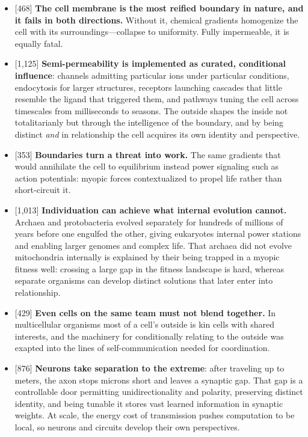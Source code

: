 \documentclass[11pt]{article}
\newcommand{\ct}[1]{{\footnotesize\color{black!55}[#1]}\hspace{1pt}}
\begin{document}
\begin{itemize}
  \item \ct{468} \textbf{The cell membrane is the most reified boundary in nature, and it fails in both directions.} Without it, chemical gradients homogenize the cell with its surroundings---collapse to uniformity. Fully impermeable, it is equally fatal.
  \item \ct{1,125} \textbf{Semi-permeability is implemented as curated, conditional influence}: channels admitting particular ions under particular conditions, endocytosis for larger structures, receptors launching cascades that little resemble the ligand that triggered them, and pathways tuning the cell across timescales from milliseconds to seasons. The outside shapes the inside not totalitarianly but through the intelligence of the boundary, and by being distinct \emph{and} in relationship the cell acquires its own identity and perspective.
  \item \ct{353} \textbf{Boundaries turn a threat into work.} The same gradients that would annihilate the cell to equilibrium instead power signaling such as action potentials: myopic forces contextualized to propel life rather than short-circuit it.
  \item \ct{1,013} \textbf{Individuation can achieve what internal evolution cannot.} Archaea and protobacteria evolved separately for hundreds of millions of years before one engulfed the other, giving eukaryotes internal power stations and enabling larger genomes and complex life. That archaea did not evolve mitochondria internally is explained by their being trapped in a myopic fitness well: crossing a large gap in the fitness landscape is hard, whereas separate organisms can develop distinct solutions that later enter into relationship.
  \item \ct{429} \textbf{Even cells on the same team must not blend together.} In multicellular organisms most of a cell's outside is kin cells with shared interests, and the machinery for conditionally relating to the outside was exapted into the lines of self-communication needed for coordination.
  \item \ct{876} \textbf{Neurons take separation to the extreme}: after traveling up to meters, the axon stops microns short and leaves a synaptic gap. That gap is a controllable door permitting unidirectionality and polarity, preserving distinct identity, and being tunable it stores vast learned information in synaptic weights. At scale, the energy cost of transmission pushes computation to be local, so neurons and circuits develop their own perspectives.
\end{itemize}
\end{document}
